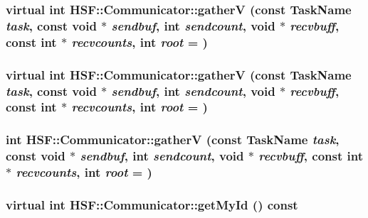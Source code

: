 \label{classHSF_1_1Communicator_a27fd4507bb56bef2605e6f8d52fa5fb3}
\hypertarget{classHSF_1_1Communicator_a8cd4f1f50d2c24fd0b3bc1bf3a30b8e0}{
\subsubsection[{gatherV}]{\setlength{\rightskip}{0pt plus 5cm}virtual int HSF::Communicator::gatherV (const {\bf TaskName} {\em task}, \/  const void $\ast$ {\em sendbuf}, \/  int {\em sendcount}, \/  void $\ast$ {\em recvbuff}, \/  const int $\ast$ {\em recvcounts}, \/  int {\em root} = {})}}
\label{classHSF_1_1Communicator_a8cd4f1f50d2c24fd0b3bc1bf3a30b8e0}
\hypertarget{classHSF_1_1Communicator_a8cd4f1f50d2c24fd0b3bc1bf3a30b8e0}{
\subsubsection[{gatherV}]{\setlength{\rightskip}{0pt plus 5cm}virtual int HSF::Communicator::gatherV (const {\bf TaskName} {\em task}, \/  const void $\ast$ {\em sendbuf}, \/  int {\em sendcount}, \/  void $\ast$ {\em recvbuff}, \/  const int $\ast$ {\em recvcounts}, \/  int {\em root} = {})}}
\label{classHSF_1_1Communicator_a8cd4f1f50d2c24fd0b3bc1bf3a30b8e0}
\hypertarget{classHSF_1_1Communicator_a26c56ac757a53a2627babfe4ad655215}{
\subsubsection[{gatherV}]{\setlength{\rightskip}{0pt plus 5cm}int HSF::Communicator::gatherV (const {\bf TaskName} {\em task}, \/  const void $\ast$ {\em sendbuf}, \/  int {\em sendcount}, \/  void $\ast$ {\em recvbuff}, \/  const int $\ast$ {\em recvcounts}, \/  int {\em root} = {})}}
\label{classHSF_1_1Communicator_a26c56ac757a53a2627babfe4ad655215}
\hypertarget{classHSF_1_1Communicator_a49da303dc707182ac09c2021a7b36619}{
\subsubsection[{getMyId}]{\setlength{\rightskip}{0pt plus 5cm}virtual int HSF::Communicator::getMyId () const}}
